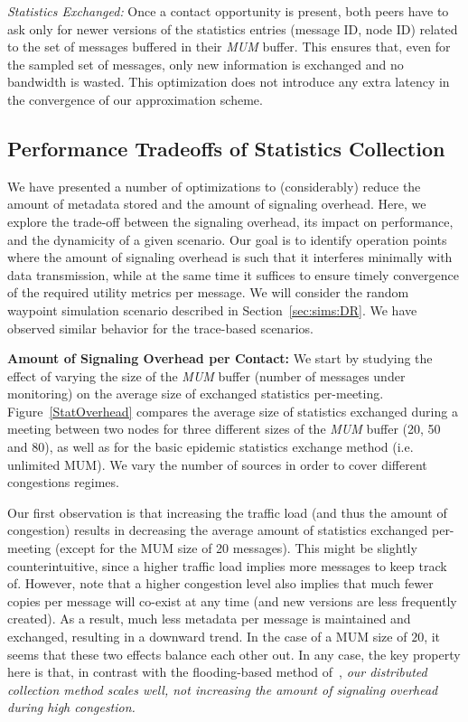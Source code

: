 \emph{Statistics Exchanged:} Once a contact opportunity is present, both peers have to ask only for newer versions of the statistics entries (message ID, node ID) related to the set of messages buffered in their \emph{MUM} buffer. This ensures that, even for the sampled set of messages, only new information is exchanged and no bandwidth is wasted. This optimization does not introduce any extra latency in the convergence of our approximation scheme.

\subsection{Performance Tradeoffs of Statistics Collection}
\label{PENHCM}

We have presented a number of optimizations to (considerably) reduce the amount of metadata stored and the amount of signaling overhead. Here, we explore the trade-off between the signaling overhead, its impact on performance, and the dynamicity of a given scenario. Our goal is to identify operation points where the amount of signaling overhead is such that it interferes minimally with data transmission, while at the same time it suffices to ensure timely convergence of the required utility metrics per message. We will consider the random waypoint simulation scenario described in Section~\ref{sec:sims:DR}. We have observed similar behavior for the trace-based scenarios.

\textbf{Amount of Signaling Overhead per Contact:} We start by studying the effect of varying the size of the \emph{MUM} buffer (number of messages under monitoring) on the average size of exchanged statistics per-meeting. Figure~\ref{StatOverhead} compares the average size of statistics exchanged during a meeting between two nodes for three different sizes of the \emph{MUM} buffer (20, 50 and 80), as well as for the basic epidemic statistics exchange method (i.e. unlimited MUM). We vary the number of sources in order to cover different congestions regimes.

Our first observation is that increasing the traffic load (and thus the amount of congestion) results in decreasing the average amount of statistics exchanged per-meeting (except for the MUM size of 20 messages). This might be slightly counterintuitive, since a higher traffic load implies more messages to keep track of. However, note that a higher congestion level also implies that much fewer copies per message will co-exist at any time (and new versions are less frequently created). As a result, much less metadata per message is maintained and exchanged, resulting in a downward trend. In the case of a MUM size of $20$, it seems that these two effects balance each other out. In any case, the key property here is that, in contrast with the flooding-based method of~\cite{Levine:Sigcomm07}, \emph{our distributed collection method scales well, not increasing the amount of signaling overhead during high congestion.}

